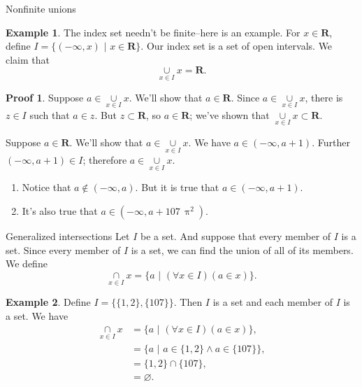 \documentclass[fleqn]{beamer}
\newcommand{\reals}{\mathbf{R}}
\theoremstyle{definition}
\newtheorem{myex}{Example}
\newtheorem{myproof}{Proof}
\begin{document}
\begin{frame}{Nonfinite unions}

\begin{myex}  The index set needn't be finite--here is an example.  For \(x \in \reals\), define \( I = \{ (-\infty, x) \,\, | \,\, x \in \reals \} \). Our index set is a set of open intervals. 
We claim that
\[
    \underset{x \in I}{\cup} x  = \reals.
\]
\end{myex} 

\begin{myproof}  Suppose \(a \in   \underset{x \in I}{\cup} x  \).  We'll show that \(a \in \reals\).  Since  \(a \in   \underset{x \in I}{\cup} x  \), there is \(z \in I\) such that \(a \in z\).  But \(z \subset \reals\), so \(a \in \reals\); we've shown that   \( \underset{x \in I}{\cup} x  \subset \reals\).

\quad Suppose \(a \in   \reals\).   We'll show that \(a \in  \underset{x \in I}{\cup} x  \).  We have \(a \in (-\infty, a + 1)\). Further  \( (-\infty, a + 1) \in I\); therefore  \(a \in  \underset{x \in I}{\cup} x \).
\end{myproof}

\begin{enumerate} 

\item Notice that \( a \not \in  (-\infty, a)\).  But it is true that \(a \in (-\infty, a + 1)\).

\item It's also true that  \(a \in (-\infty, a + 107 \, \uppi^2)\).
\end{enumerate}
\end{frame}

\begin{frame}{Generalized intersections}
Let \(I\) be a set. And suppose that every member of \(I\) is a set.  Since every member of \(I\) is a set, we can find the union of all of its members. We define
\[
    \underset{x \in I}{\cap} x  = \{ a  \, \,  | \, \, (\forall x \in I)(a \in x) \}.
\]


\begin{myex}  Define \(I = \{ \{1,2\}, \{107\} \} \). Then \(I\) is a set and each member of \(I\) is a set. We have
\begin{align*}
 \underset{x \in I}{\cap} x  &= \{ a  \, \,  | \, \, (\forall x \in I)(a \in x) \}, \\
                                                   &= \{ a  \, \,  | \, \,   a \in   \{1,2\}  \land    a \in   \{107\} \}, \\
                                                   &= \{1,2\}  \cap \{107\}, \\
                                                   &=  \varnothing.
\end{align*}

\end{myex}
\end{frame}
\end{document}
